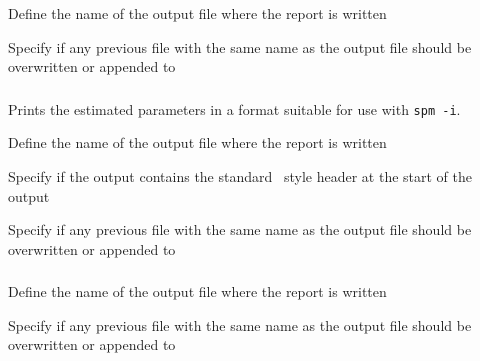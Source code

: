  {Define the name of the output file where the report is written}

 {Specify if any previous file with the same name as the output file should be overwritten or appended to}

\subsubsection[Printing the estimated parameter values out as a vector]{\label{sec:InputFileFormat}}

Prints the estimated parameters in a format suitable for use with \texttt{spm -i}.

 {Define the name of the output file where the report is written}

 {Specify if the output contains the standard \SPM\ style header at the start of the output}

 {Specify if any previous file with the same name as the output file should be overwritten or appended to}

\subsubsection[Print the objective function values]{}

 {Define the name of the output file where the report is written}

 {Specify if any previous file with the same name as the output file should be overwritten or appended to}

\subsubsection[Print the covariance matrix]{}

